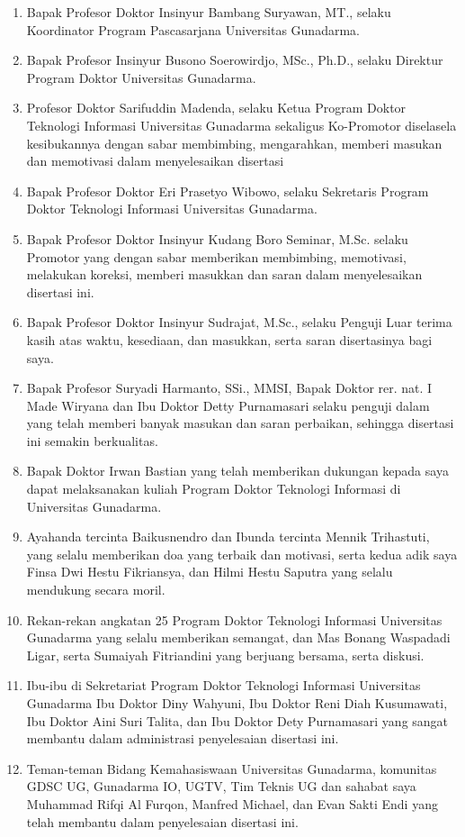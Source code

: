 \begin{enumerate}
\item Bapak Profesor Doktor Insinyur Bambang Suryawan, MT., selaku Koordinator Program Pascasarjana Universitas Gunadarma.
\item Bapak Profesor Insinyur Busono Soerowirdjo, MSc., Ph.D., selaku Direktur Program Doktor Universitas Gunadarma.
\item Profesor Doktor Sarifuddin Madenda, selaku Ketua Program Doktor Teknologi Informasi Universitas Gunadarma sekaligus Ko-Promotor diselasela kesibukannya dengan sabar membimbing, mengarahkan, memberi masukan dan memotivasi dalam menyelesaikan disertasi
\item Bapak Profesor Doktor Eri Prasetyo Wibowo, selaku Sekretaris Program Doktor Teknologi Informasi Universitas Gunadarma.
\item Bapak Profesor Doktor Insinyur Kudang Boro Seminar, M.Sc. selaku Promotor yang dengan sabar memberikan membimbing, memotivasi, melakukan koreksi, memberi masukkan dan saran dalam menyelesaikan disertasi ini.
\item Bapak Profesor Doktor Insinyur Sudrajat, M.Sc., selaku Penguji Luar terima kasih atas waktu, kesediaan, dan masukkan, serta saran disertasinya bagi saya.
\item Bapak Profesor Suryadi Harmanto, SSi., MMSI, Bapak Doktor rer. nat. I Made Wiryana dan Ibu Doktor Detty Purnamasari selaku penguji dalam yang telah memberi banyak masukan dan saran perbaikan, sehingga disertasi ini semakin berkualitas.
\item Bapak Doktor Irwan Bastian yang telah memberikan dukungan kepada saya dapat melaksanakan kuliah Program Doktor Teknologi Informasi di Universitas Gunadarma.
\item Ayahanda tercinta Baikusnendro dan Ibunda tercinta Mennik Trihastuti, yang selalu memberikan doa yang terbaik dan motivasi, serta kedua adik saya Finsa Dwi Hestu Fikriansya, dan Hilmi Hestu Saputra yang selalu mendukung secara moril.
\item Rekan-rekan angkatan 25 Program Doktor Teknologi Informasi Universitas
Gunadarma yang selalu memberikan semangat, dan Mas Bonang Waspadadi Ligar, serta Sumaiyah Fitriandini yang berjuang bersama, serta diskusi.
\item Ibu-ibu di Sekretariat Program Doktor Teknologi Informasi Universitas Gunadarma Ibu Doktor Diny Wahyuni, Ibu Doktor Reni Diah Kusumawati, Ibu Doktor Aini Suri Talita, dan Ibu Doktor Dety Purnamasari yang sangat membantu dalam administrasi penyelesaian disertasi ini.
\item Teman-teman Bidang Kemahasiswaan Universitas Gunadarma, komunitas GDSC UG, Gunadarma IO, UGTV, Tim Teknis UG dan sahabat saya Muhammad Rifqi Al Furqon, Manfred Michael, dan Evan Sakti Endi yang telah membantu dalam penyelesaian disertasi ini.
\end{enumerate}

